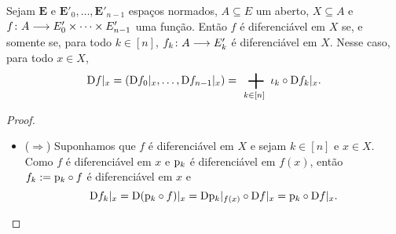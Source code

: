 \begin{proposition}
\label{prop:diferenciabilidade.componentes}
Sejam $\bm E$ e $\bm E'_0, \ldots, \bm E'_{n-1}$ espaços normados, $A \subseteq E$ um aberto, $X \subseteq A$ e ${f}\colon {A} \longrightarrow {E'_0 \times \cdots \times E'_{n-1}}$ uma função. Então $f$ é diferenciável em $X$ se, e somente se, para todo $k \in [n]$, ${f_k}\colon {A} \longrightarrow {E'_k}$ é diferenciável em $X$. Nesse caso, para todo $x \in X$,
	\begin{equation*}
	\D f|_x = (\D f_0|_x, \ldots, \D f_{n-1}|_x) = \sum_{k \in [n]} \inclu_k \circ \D f_k|_x.
	\end{equation*}
\end{proposition}
\begin{proof}
	\begin{itemize}

	\item ($\Rightarrow$) Suponhamos que $f$ é diferenciável em $X$ e sejam $k \in [n]$ e $x \in X$. Como $f$ é diferenciável em $x$ e $\mathrm{p}_k$ é diferenciável em $f(x)$, então $f_k := \mathrm{p}_k \circ f$ é diferenciável em $x$ e
		\begin{equation*}
		\mathrm{D} f_k|_x = \mathrm{D} (\mathrm{p}_k \circ f)|_x = \mathrm{D} \mathrm{p}_k|_{f(x)} \circ \mathrm{D} f|_x = \mathrm{p}_k \circ \mathrm{D} f|_x.
		\end{equation*}


\end{itemize}
\end{proof}
